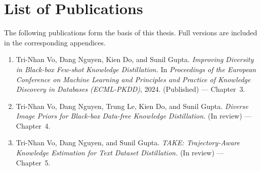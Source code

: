 \chapter*{List of Publications}

The following publications form the basis of this thesis.
Full versions are included in the corresponding appendices.

\begin{enumerate}
  \item {
      Tri-Nhan Vo, Dang Nguyen, Kien Do, and Sunil Gupta.
      \textit{Improving Diversity in Black-box Few-shot Knowledge Distillation.}
      In \textit{Proceedings of the European Conference on Machine Learning and Principles and Practice of Knowledge Discovery in Databases (ECML-PKDD)}, 2024.
      (Published) --- Chapter~3.
    }
  \item {
      Tri-Nhan Vo, Dang Nguyen, Trung Le, Kien Do, and Sunil Gupta.
      \textit{Diverse Image Priors for Black-box Data-free Knowledge Distillation.}
      (In review) --- Chapter~4.
    }
  \item {
      Tri-Nhan Vo, Dang Nguyen, and Sunil Gupta.
      \textit{TAKE: Trajectory-Aware Knowledge Estimation for Text Dataset Distillation.}
      (In review) --- Chapter~5.
    }
\end{enumerate}
